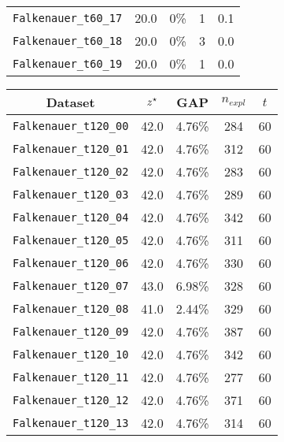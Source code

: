 \begin{figure}[!ht]
{\begin{minipage}{0.47\linewidth}
\begin{tabular}{|ccccc|}
			\texttt{Falkenauer\_t60\_17} & 20.0           & 0\% & 1               & 0.1       \\
			\texttt{Falkenauer\_t60\_18} & 20.0           & 0\% & 3               & 0.0         \\
			\texttt{Falkenauer\_t60\_19} & 20.0           & 0\% & 1               & 0.0 \\
			\hline  
		\end{tabular}
	\end{minipage}
	\begin{minipage}{0.47\linewidth}
		\centering
		\begin{tabular}{|ccccc|}
			\hline
			\rowcolor{gray!50}
			Dataset                       & ${z}^{\star}$ & GAP  & $n_{expl}$ & $t$ \\
			\hline
			\texttt{Falkenauer\_t120\_00} & 42.0           & 4.76\% & 284             & 60      \\
			\texttt{Falkenauer\_t120\_01} & 42.0           & 4.76\% & 312             & 60       \\
			\texttt{Falkenauer\_t120\_02} & 42.0           & 4.76\% & 283             & 60      \\
			\texttt{Falkenauer\_t120\_03} & 42.0           & 4.76\% & 289             & 60      \\
			\texttt{Falkenauer\_t120\_04} & 42.0           & 4.76\% & 342             & 60      \\
			\texttt{Falkenauer\_t120\_05} & 42.0           & 4.76\% & 311             & 60      \\
			\texttt{Falkenauer\_t120\_06} & 42.0           & 4.76\% & 330             & 60      \\
			\texttt{Falkenauer\_t120\_07} & 43.0           & 6.98\% & 328             & 60      \\
			\texttt{Falkenauer\_t120\_08} & 41.0           & 2.44\% & 329             & 60      \\
			\texttt{Falkenauer\_t120\_09} & 42.0           & 4.76\% & 387             & 60      \\
			\texttt{Falkenauer\_t120\_10} & 42.0           & 4.76\% & 342             & 60      \\
			\texttt{Falkenauer\_t120\_11} & 42.0           & 4.76\% & 277             & 60      \\
			\texttt{Falkenauer\_t120\_12} & 42.0           & 4.76\% & 371             & 60      \\
			\texttt{Falkenauer\_t120\_13} & 42.0           & 4.76\% & 314             & 60      \\

\end{tabular}
\end{minipage}}
\end{figure}
